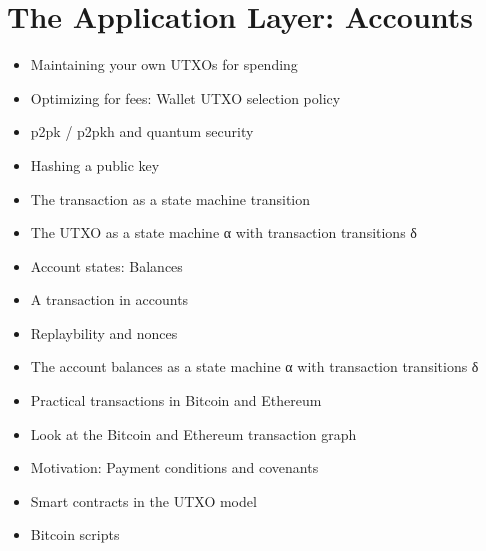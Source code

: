 \chapter{The Application Layer: Accounts}

{\color{red}
\begin{itemize}
\item Maintaining your own UTXOs for spending
\item Optimizing for fees: Wallet UTXO selection policy
\item p2pk / p2pkh and quantum security
\item Hashing a public key
\item The transaction as a state machine transition
\item The UTXO as a state machine α with transaction transitions δ
\item Account states: Balances
\item A transaction in accounts
\item Replaybility and nonces
\item The account balances as a state machine α with transaction transitions δ
\item Practical transactions in Bitcoin and Ethereum
\item Look at the Bitcoin and Ethereum transaction graph
\item Motivation: Payment conditions and covenants
\item Smart contracts in the UTXO model
\item Bitcoin scripts
\end{itemize}
}
